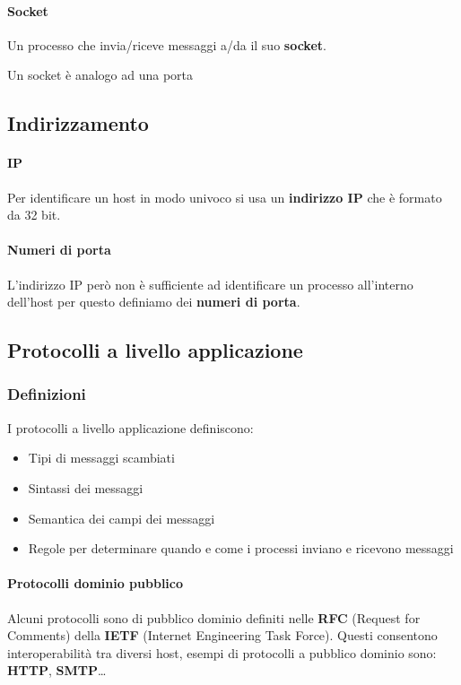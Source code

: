             \paragraph{Socket} Un processo che invia/riceve messaggi a/da il suo \textbf{socket}.
            
            Un socket è analogo ad una porta 

    \subsection{Indirizzamento}
        \paragraph{IP} Per identificare un host in modo univoco si usa un \textbf{indirizzo IP} che è formato da 32 bit. 

        \paragraph{Numeri di porta} L'indirizzo IP però non è sufficiente ad identificare un processo all'interno dell'host per questo definiamo dei \textbf{numeri di porta}.

    \subsection{Protocolli a livello applicazione}
        \subsubsection{Definizioni}
            I protocolli a livello applicazione definiscono:
                \begin{itemize}
                    \item Tipi di messaggi scambiati
                    \item Sintassi dei messaggi
                    \item Semantica dei campi dei messaggi
                    \item Regole per determinare quando e come i processi inviano e ricevono messaggi
                \end{itemize}
            \paragraph{Protocolli dominio pubblico}Alcuni protocolli sono di pubblico dominio definiti nelle \textbf{RFC} (Request for Comments) della \textbf{IETF} (Internet Engineering Task Force). Questi consentono interoperabilità tra diversi host, esempi di protocolli a pubblico dominio sono: \textbf{HTTP}, \textbf{SMTP}\dots
